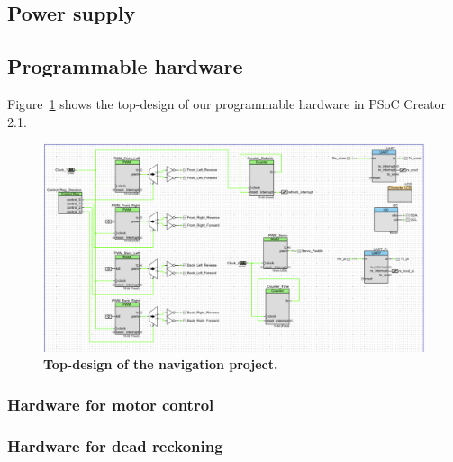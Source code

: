 \documentclass[letterpaper, 11pt]{article}
\begin{document}
\begin{enumerate}[label=\textbf{\arabic*.}]
\subsection{Power supply}

\subsection{Programmable hardware}
Figure~\ref{fig:topdesign} shows the top-design of our programmable hardware in PSoC Creator 2.1.
\begin{figure}[ht]
    \centering
    \includegraphics[height=0.99\textwidth,
                     angle=-90, origin=c,
                     trim=1.2in 1in 1.8in 1in, clip]{images/topdesign.pdf}
    \vspace*{-3cm}
    \caption{\textbf{Top-design of the navigation project.}}
    \label{fig:topdesign}
\end{figure}

\subsubsection{Hardware for motor control}

\subsubsection{Hardware for dead reckoning}


\end{enumerate}
\end{document}
